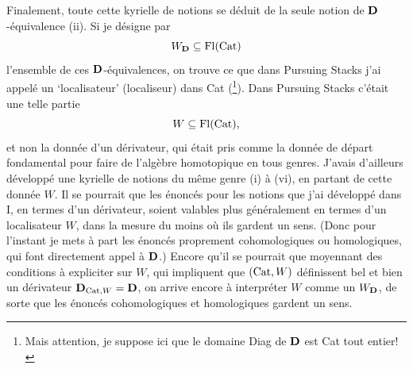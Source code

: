 Finalement, toute cette kyrielle de notions se déduit de la seule notion de $\mathbf{D}$-équivalence (ii). Si je désigne par
\[
W_{\mathbf{D}} \subseteq \operatorname{Fl}(\mathrm{Cat})
\]
l’ensemble de ces $\mathbf{D}$-équivalences, on trouve ce que dans Pursuing Stacks j’ai appelé un ‘localisateur’ (localiseur) dans Cat (\footnote{Mais attention, je suppose ici que le domaine Diag de $\mathbf{D}$ est Cat tout entier!}). Dans Pursuing Stacks c’était une telle partie
\[
W \subseteq \operatorname{Fl}(\mathrm{Cat}),
\]
et non la donnée d’un dérivateur, qui
était pris comme la donnée de départ fondamental pour faire de l’algèbre homotopique en tous genres. J’avais d’ailleurs développé une kyrielle de notions du même genre (i) à (vi), en partant de cette donnée $W$. Il se pourrait que les énoncés pour les notions que j’ai développé dans I, en termes d’un dérivateur, soient valables plus généralement en termes d’un localisateur $W$, dans la mesure du moins où ils gardent un sens. (Donc pour l’instant je mets à part les énoncés proprement cohomologiques ou homologiques, qui font directement appel à $\mathbf{D}$.) Encore qu’il se pourrait que moyennant des conditions à expliciter sur $W$, qui impliquent que $(\mathrm{Cat}, W)$ définissent bel et bien un dérivateur $\mathbf{D}_{\mathrm{Cat},W} = \mathbf{D}$, on arrive encore à interpréter $W$ comme un $W_{\mathbf{D}}$, de sorte que les énoncés cohomologiques et homologiques gardent un sens.

